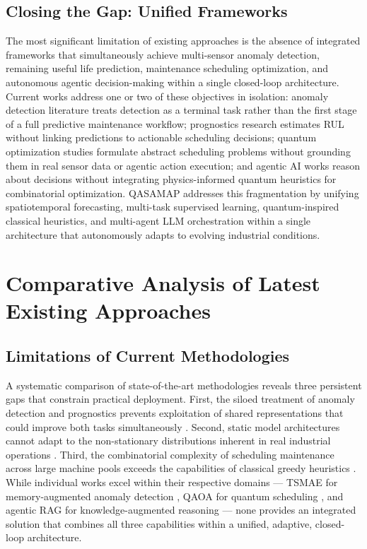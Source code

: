 \subsection{Closing the Gap: Unified Frameworks}

The most significant limitation of existing approaches is the absence of integrated frameworks that simultaneously achieve multi-sensor anomaly detection, remaining useful life prediction, maintenance scheduling optimization, and autonomous agentic decision-making within a single closed-loop architecture. Current works address one or two of these objectives in isolation: anomaly detection literature \cite{Chalapathy2019, pang_deep_2021} treats detection as a terminal task rather than the first stage of a full predictive maintenance workflow; prognostics research \cite{nizam_real-time_2022} estimates RUL without linking predictions to actionable scheduling decisions; quantum optimization studies \cite{dalyac_qualifying_2021, Blekos2024} formulate abstract scheduling problems without grounding them in real sensor data or agentic action execution; and agentic AI works \cite{erukude_agentic_2025, dwivedi_agentic_2026} reason about decisions without integrating physics-informed quantum heuristics for combinatorial optimization. QASAMAP addresses this fragmentation by unifying spatiotemporal forecasting, multi-task supervised learning, quantum-inspired classical heuristics, and multi-agent LLM orchestration within a single architecture that autonomously adapts to evolving industrial conditions.

\section{Comparative Analysis of Latest Existing Approaches}



\subsection{Limitations of Current Methodologies}

A systematic comparison of state-of-the-art methodologies reveals three persistent gaps that constrain practical deployment. First, the siloed treatment of anomaly detection and prognostics prevents exploitation of shared representations that could improve both tasks simultaneously \cite{kendall_multi-task_2017}. Second, static model architectures cannot adapt to the non-stationary distributions inherent in real industrial operations \cite{lee_autoencoder-based_2024}. Third, the combinatorial complexity of scheduling maintenance across large machine pools exceeds the capabilities of classical greedy heuristics \cite{dalyac_qualifying_2021}. While individual works excel within their respective domains --- TSMAE for memory-augmented anomaly detection \cite{Gao2022}, QAOA for quantum scheduling \cite{rosendo_quantum_2025}, and agentic RAG for knowledge-augmented reasoning \cite{singh_agentic_2025} --- none provides an integrated solution that combines all three capabilities within a unified, adaptive, closed-loop architecture.

